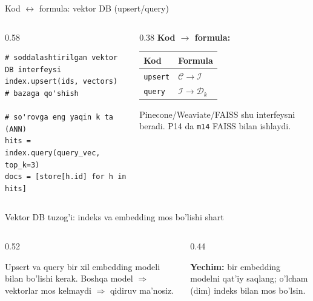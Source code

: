 \documentclass[aspectratio=169,11pt]{beamer}
\begin{document}
\begin{frame}[fragile]{Kod $\leftrightarrow$ formula: vektor DB (upsert/query)}
  \begin{columns}[T]
    \begin{column}{0.58\textwidth}
\begin{lstlisting}
# soddalashtirilgan vektor DB interfeysi
index.upsert(ids, vectors)        # bazaga qo'shish

# so'rovga eng yaqin k ta (ANN)
hits = index.query(query_vec, top_k=3)
docs = [store[h.id] for h in hits]
\end{lstlisting}
    \end{column}
    \begin{column}{0.38\textwidth}
      \textbf{Kod $\to$ formula:}\\[3pt]
      \footnotesize
      \begin{tabular}{p{1.6cm}p{2.1cm}}
        \toprule
        Kod & Formula \\
        \midrule
        \texttt{upsert} & $\mathcal{C}\to\mathcal{I}$ \\
        \texttt{query} & $\mathcal{I}\to\mathcal{D}_k$ \\
        \bottomrule
      \end{tabular}
      \vspace{4pt}
      \begin{tcolorbox}[okbox,top=2pt,bottom=2pt]
        \footnotesize
        Pinecone/Weaviate/FAISS shu interfeysni beradi. P14 da \texttt{m14}
        FAISS bilan ishlaydi.
      \end{tcolorbox}
    \end{column}
  \end{columns}
\end{frame}

\begin{frame}{Vektor DB tuzog'i: indeks va embedding mos bo'lishi shart}
  \begin{columns}[T]
    \begin{column}{0.52\textwidth}
      \begin{tcolorbox}[warnbox,title={Nomuvofiq embedding}]
        \small
        Upsert va query bir xil embedding modeli bilan bo'lishi kerak. Boshqa
        model $\Rightarrow$ vektorlar mos kelmaydi $\Rightarrow$ qidiruv ma'nosiz.
      \end{tcolorbox}
    \end{column}
    \begin{column}{0.44\textwidth}
      \begin{tcolorbox}[okbox,top=2pt,bottom=2pt]
        \footnotesize
        \textbf{Yechim:} bir embedding modelni qat'iy saqlang; o'lcham (dim)
        indeks bilan mos bo'lsin.
      \end{tcolorbox}
    \end{column}
  \end{columns}
\end{frame}
\end{document}
